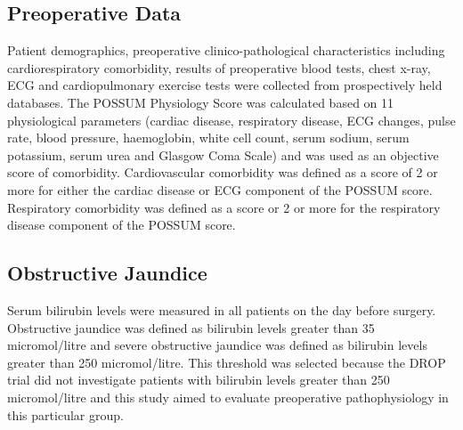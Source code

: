 \subsection{Preoperative Data}
Patient demographics, preoperative clinico-pathological characteristics including cardiorespiratory comorbidity, results of preoperative blood tests, chest x-ray, ECG and cardiopulmonary exercise tests were collected from prospectively held databases. The POSSUM Physiology Score was calculated based on 11 physiological parameters (cardiac disease, respiratory disease, ECG changes, pulse rate, blood pressure, haemoglobin, white cell count, serum sodium, serum potassium, serum urea and Glasgow Coma Scale) and was used as an objective score of comorbidity. Cardiovascular comorbidity was defined as a score of 2 or more for either the cardiac disease or ECG component of the POSSUM score. Respiratory comorbidity was defined as a score or 2 or more for the respiratory disease component of the POSSUM score. 

\subsection{Obstructive Jaundice}
Serum bilirubin levels were measured in all patients on the day before surgery. Obstructive jaundice was defined as bilirubin levels greater than 35 micromol/litre and severe obstructive jaundice was defined as bilirubin levels greater than 250 micromol/litre. This threshold was selected because the DROP trial did not investigate patients with bilirubin levels greater than 250 micromol/litre and this study aimed to evaluate preoperative pathophysiology in this particular group. 

